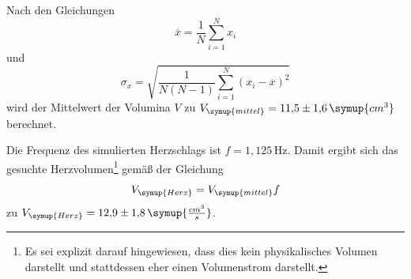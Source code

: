Nach den Gleichungen
\begin{equation}
  \overline{x} = \frac{1}{N} \sum\limits_{i = 1}^N x_i
  \label{eqn:mean}
\end{equation}
und
\begin{equation}
  \sigma_x = \sqrt{\frac{1}{N(N-1)}
    \sum\limits_{i = 1}^N
    (x_i-\overline{x})^2}
    \label{eqn:std}
\end{equation}
wird der Mittelwert der Volumina $V$ zu $V_{\symup{mittel}}=11{,}5\pm1{,}6\,\symup{cm^3}$
berechnet.

Die Frequenz des simulierten Herzschlags ist $f=1{,}125\,$Hz. Damit ergibt sich
das gesuchte Herzvolumen\footnote{Es sei explizit darauf hingewiesen, dass dies kein
physikalisches Volumen darstellt und stattdessen eher einen Volumenstrom darstellt.} gemäß der Gleichung
\begin{equation}
  V_{\symup{Herz}} = V_{\symup{mittel}} f
\end{equation}
zu $V_{\symup{Herz}}=12{,}9\pm1{,}8\, \symup{\frac{cm^3}{s}}$.
